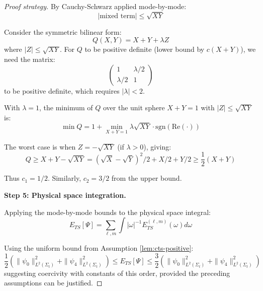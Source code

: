 \documentclass[12pt,a4paper]{article}
\begin{document}
\begin{proof}[Proof strategy]
By Cauchy-Schwarz applied mode-by-mode:
\begin{equation}
|\text{mixed term}| \leq \sqrt{XY}
\end{equation}

Consider the symmetric bilinear form:
\begin{equation}
Q(X, Y) = X + Y + \lambda Z
\end{equation}
where $|Z| \leq \sqrt{XY}$. For $Q$ to be positive definite (lower bound by $c(X + Y)$), we need the matrix:
\begin{equation}
\begin{pmatrix} 1 & \lambda/2 \\ \lambda/2 & 1 \end{pmatrix}
\end{equation}
to be positive definite, which requires $|\lambda| < 2$.

With $\lambda = 1$, the minimum of $Q$ over the unit sphere $X + Y = 1$ with $|Z| \leq \sqrt{XY}$ is:
\begin{equation}
\min Q = 1 + \min_{X+Y=1} \lambda \sqrt{XY} \cdot \text{sgn}(\text{Re}(\cdot))
\end{equation}

The worst case is when $Z = -\sqrt{XY}$ (if $\lambda > 0$), giving:
\begin{equation}
Q \geq X + Y - \sqrt{XY} = (\sqrt{X} - \sqrt{Y})^2/2 + X/2 + Y/2 \geq \frac{1}{2}(X + Y)
\end{equation}

Thus $c_1 = 1/2$. Similarly, $c_2 = 3/2$ from the upper bound.

\textbf{Step 5: Physical space integration.}

Applying the mode-by-mode bounds to the physical space integral:
\begin{equation}
E_{TS}[\Psi] = \sum_{\ell,m}\int |\omega|^{-1} E_{TS}^{(\ell,m)}(\omega) d\omega
\end{equation}

Using the uniform bound from Assumption \ref{lem:cts-positive}:
\begin{equation}
\frac{1}{2}\left(\|\psi_0\|_{L^2(\Sigma_t)}^2 + \|\psi_4\|_{L^2(\Sigma_t)}^2\right) \leq E_{TS}[\Psi] \leq \frac{3}{2}\left(\|\psi_0\|_{L^2(\Sigma_t)}^2 + \|\psi_4\|_{L^2(\Sigma_t)}^2\right)
\end{equation}
suggesting coercivity with constants of this order, provided the preceding assumptions can be justified.
\end{proof}
\end{document}
